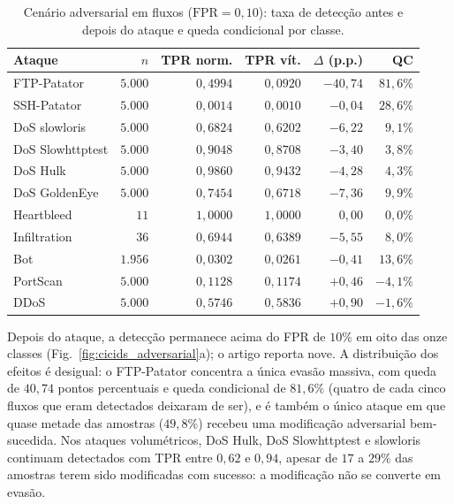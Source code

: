 \documentclass[conference]{IEEEtran}
\begin{document}
\begin{table}[!t]
\centering
\footnotesize
\setlength{\tabcolsep}{3.5pt}
\caption{Cenário adversarial em fluxos ($\text{FPR} = 0{,}10$): taxa de detecção antes e depois do ataque e queda condicional por classe.}
\label{tab:adv_fluxo}
\begin{tabular}{@{}lrrrrr@{}}
\toprule
\textbf{Ataque} & \textbf{$n$} & \textbf{TPR norm.} & \textbf{TPR vít.} & \textbf{$\Delta$ (p.p.)} & \textbf{QC} \\
\midrule
FTP-Patator & $5.000$ & $0{,}4994$ & $0{,}0920$ & $-40{,}74$ & $81{,}6\%$ \\
SSH-Patator & $5.000$ & $0{,}0014$ & $0{,}0010$ & $-0{,}04$ & $28{,}6\%$ \\
DoS slowloris & $5.000$ & $0{,}6824$ & $0{,}6202$ & $-6{,}22$ & $9{,}1\%$ \\
DoS Slowhttptest & $5.000$ & $0{,}9048$ & $0{,}8708$ & $-3{,}40$ & $3{,}8\%$ \\
DoS Hulk & $5.000$ & $0{,}9860$ & $0{,}9432$ & $-4{,}28$ & $4{,}3\%$ \\
DoS GoldenEye & $5.000$ & $0{,}7454$ & $0{,}6718$ & $-7{,}36$ & $9{,}9\%$ \\
Heartbleed & $11$ & $1{,}0000$ & $1{,}0000$ & $0{,}00$ & $0{,}0\%$ \\
Infiltration & $36$ & $0{,}6944$ & $0{,}6389$ & $-5{,}55$ & $8{,}0\%$ \\
Bot & $1.956$ & $0{,}0302$ & $0{,}0261$ & $-0{,}41$ & $13{,}6\%$ \\
PortScan & $5.000$ & $0{,}1128$ & $0{,}1174$ & $+0{,}46$ & $-4{,}1\%$ \\
DDoS & $5.000$ & $0{,}5746$ & $0{,}5836$ & $+0{,}90$ & $-1{,}6\%$ \\
\bottomrule
\end{tabular}
\end{table}

Depois do ataque, a detecção permanece acima do FPR de $10\%$ em oito das onze classes (Fig.~\ref{fig:cicids_adversarial}a); o artigo reporta nove.
A distribuição dos efeitos é desigual: o FTP-Patator concentra a única evasão massiva, com queda de $40{,}74$ pontos percentuais e queda condicional de $81{,}6\%$ (quatro de cada cinco fluxos que eram detectados deixaram de ser), e é também o único ataque em que quase metade das amostras ($49{,}8\%$) recebeu uma modificação adversarial bem-sucedida.
Nos ataques volumétricos, DoS Hulk, DoS Slowhttptest e slowloris continuam detectados com TPR entre $0{,}62$ e $0{,}94$, apesar de $17$ a $29\%$ das amostras terem sido modificadas com sucesso: a modificação não se converte em evasão.
\end{document}
